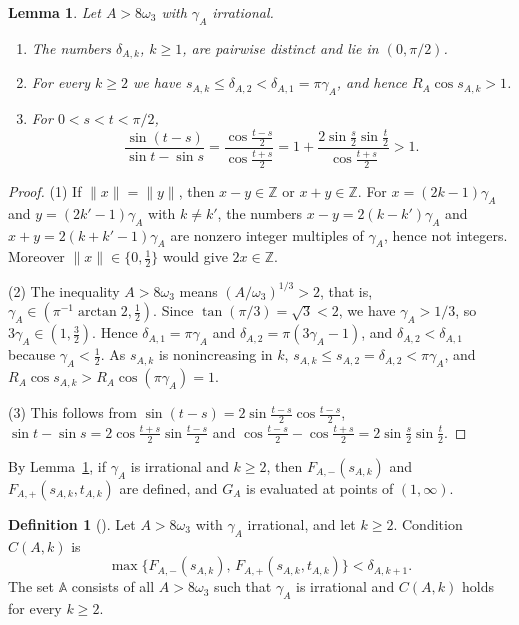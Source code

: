 \documentclass{amsart}
\newtheorem{lemma}[theorem]{Lemma}
\theoremstyle{definition}
\newtheorem{definition}[theorem]{Definition}
\theoremstyle{remark}
\numberwithin{equation}{section}
\newcommand{\Z}{\mathbb{Z}}
\newcommand{\AAA}{\mathbb{A}}
\newcommand{\norm}[1]{\lVert #1 \rVert}
\begin{document}
\begin{lemma}\label{lem:welldef}
Let $A>8\omega_3$ with $\gamma_A$ irrational.
\begin{enumerate}
\item The numbers $\delta_{A,k}$, $k\ge1$, are pairwise distinct and lie in $(0,\pi/2)$.
\item For every $k\ge2$ we have $s_{A,k}\le\delta_{A,2}<\delta_{A,1}=\pi\gamma_A$, and hence $R_A\cos s_{A,k}>1$.
\item For $0<s<t<\pi/2$,
\begin{equation}\label{eq:ratio}
\frac{\sin(t-s)}{\sin t-\sin s}=\frac{\cos\frac{t-s}{2}}{\cos\frac{t+s}{2}}
=1+\frac{2\sin\frac s2\sin\frac t2}{\cos\frac{t+s}{2}}>1 .
\end{equation}
\end{enumerate}
\end{lemma}

\begin{proof}
(1) If $\norm{x}=\norm{y}$, then $x-y\in\Z$ or $x+y\in\Z$. For $x=(2k-1)\gamma_A$ and $y=(2k'-1)\gamma_A$ with $k\ne k'$, the numbers $x-y=2(k-k')\gamma_A$ and $x+y=2(k+k'-1)\gamma_A$ are nonzero integer multiples of $\gamma_A$, hence not integers. Moreover $\norm{x}\in\{0,\frac12\}$ would give $2x\in\Z$.

(2) The inequality $A>8\omega_3$ means $(A/\omega_3)^{1/3}>2$, that is, $\gamma_A\in(\pi^{-1}\arctan2,\tfrac12)$. Since $\tan(\pi/3)=\sqrt3<2$, we have $\gamma_A>1/3$, so $3\gamma_A\in(1,\frac32)$. Hence $\delta_{A,1}=\pi\gamma_A$ and $\delta_{A,2}=\pi(3\gamma_A-1)$, and $\delta_{A,2}<\delta_{A,1}$ because $\gamma_A<\frac12$. As $s_{A,k}$ is nonincreasing in $k$, $s_{A,k}\le s_{A,2}=\delta_{A,2}<\pi\gamma_A$, and $R_A\cos s_{A,k}>R_A\cos(\pi\gamma_A)=1$.

(3) This follows from $\sin(t-s)=2\sin\frac{t-s}2\cos\frac{t-s}2$, $\sin t-\sin s=2\cos\frac{t+s}2\sin\frac{t-s}2$ and $\cos\frac{t-s}2-\cos\frac{t+s}2=2\sin\frac s2\sin\frac t2$.
\end{proof}

By Lemma~\ref{lem:welldef}, if $\gamma_A$ is irrational and $k\ge2$, then $F_{A,-}(s_{A,k})$ and $F_{A,+}(s_{A,k},t_{A,k})$ are defined, and $G_A$ is evaluated at points of $(1,\infty)$.

\begin{definition}[{\cite[Definitions~7 and 8]{HR}}]\label{def:A}
Let $A>8\omega_3$ with $\gamma_A$ irrational, and let $k\ge2$. Condition $C(A,k)$ is
\[
\max\bigl\{F_{A,-}(s_{A,k}),\,F_{A,+}(s_{A,k},t_{A,k})\bigr\}<\delta_{A,k+1}.
\]
The set $\AAA$ consists of all $A>8\omega_3$ such that $\gamma_A$ is irrational and $C(A,k)$ holds for every $k\ge2$.
\end{definition}
\end{document}
